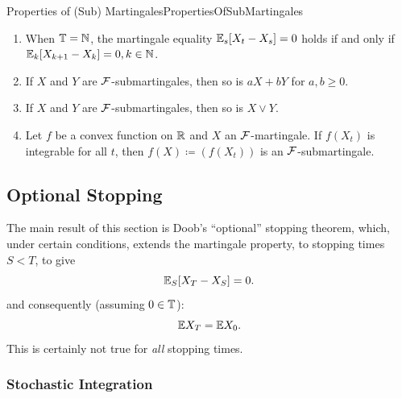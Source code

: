 \begin{thm}{Properties of (Sub) Martingales}{PropertiesOfSubMartingales}
	\begin{enumerate}
		\item When \(\mathbb{T} = \mathbb{N}\), the martingale equality \(\mathbb{E}_s [X_t - X_s] = 0\) holds if and only if \(\mathbb{E}_k [X_{k+1} - X_k] = 0, k \in \mathbb{N}\).
		\item If \(X\) and \(Y\) are \(\mathcal{F}\)-submartingales, then so is \(aX + bY\) for \(a, b \ge 0\).
		\item If \(X\) and \(Y\) are \(\mathcal{F}\)-submartingales, then so is \(X \lor Y\).
		\item Let \(f\) be a convex function on \(\mathbb{R}\) and \(X\) an \(\mathcal{F}\)-martingale. If \(f(X_t)\) is integrable for all \(t\), then \(f(X) \coloneqq (f(X_t))\) is an \(\mathcal{F}\)-submartingale.
	\end{enumerate}
\end{thm}

\subsection{Optional Stopping}
The main result of this section is Doob’s “optional” stopping theorem, which, under certain conditions, extends the martingale property,  to stopping times \(S < T\), to give
\begin{equation}\label{eq:DoobsOptionalStoppingEquality}
	\mathbb{E}_S[X_T - X_S] = 0.
\end{equation}
and consequently (assuming \(0 \in \mathbb{T}\)):
\begin{equation}\label{eq:OptionalStoppingExpectation}
	\mathbb{E} X_T = \mathbb{E} X_0.
\end{equation}
This is certainly not true for \textit{all} stopping times.
\subsubsection{Stochastic Integration}

